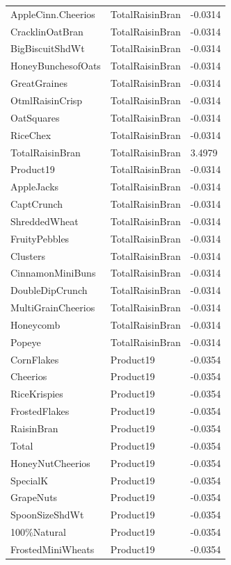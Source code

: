 \begin{table}[!htbp]
\begin{tabular}{lll}
\\
AppleCinn.Cheerios & TotalRaisinBran & -0.0314
\\
CracklinOatBran & TotalRaisinBran & -0.0314
\\
BigBiscuitShdWt & TotalRaisinBran & -0.0314
\\
HoneyBunchesofOats & TotalRaisinBran & -0.0314
\\
GreatGraines & TotalRaisinBran & -0.0314
\\
OtmlRaisinCrisp & TotalRaisinBran & -0.0314
\\
OatSquares & TotalRaisinBran & -0.0314
\\
RiceChex & TotalRaisinBran & -0.0314
\\
TotalRaisinBran & TotalRaisinBran & 3.4979
\\
Product19 & TotalRaisinBran & -0.0314
\\
AppleJacks & TotalRaisinBran & -0.0314
\\
CaptCrunch & TotalRaisinBran & -0.0314
\\
ShreddedWheat & TotalRaisinBran & -0.0314
\\
FruityPebbles & TotalRaisinBran & -0.0314
\\
Clusters & TotalRaisinBran & -0.0314
\\
CinnamonMiniBuns & TotalRaisinBran & -0.0314
\\
DoubleDipCrunch & TotalRaisinBran & -0.0314
\\
MultiGrainCheerios & TotalRaisinBran & -0.0314
\\
Honeycomb & TotalRaisinBran & -0.0314
\\
Popeye & TotalRaisinBran & -0.0314
\\
CornFlakes & Product19 & -0.0354
\\
Cheerios & Product19 & -0.0354
\\
RiceKrispies & Product19 & -0.0354
\\
FrostedFlakes & Product19 & -0.0354
\\
RaisinBran & Product19 & -0.0354
\\
Total & Product19 & -0.0354
\\
HoneyNutCheerios & Product19 & -0.0354
\\
SpecialK & Product19 & -0.0354
\\
GrapeNuts & Product19 & -0.0354
\\
SpoonSizeShdWt & Product19 & -0.0354
\\
100\%Natural & Product19 & -0.0354
\\
FrostedMiniWheats & Product19 & -0.0354

\end{tabular}
\end{table}
